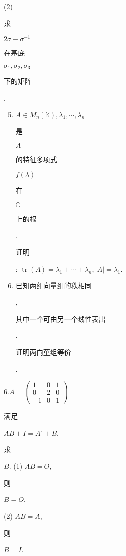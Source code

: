 \documentclass[10pt]{article}
\begin{document}
(2) \begin{CJK}{UTF8}{mj}求\end{CJK} $2 \sigma-\sigma^{-1}$ \begin{CJK}{UTF8}{mj}在基底\end{CJK} $\sigma_{1}, \sigma_{2}, \sigma_{3}$ \begin{CJK}{UTF8}{mj}下的矩阵\end{CJK}.

\begin{enumerate}
  \setcounter{enumi}{4}
  \item $A \in M_{n}(\mathbb{K}), \lambda_{1}, \cdots, \lambda_{n}$ \begin{CJK}{UTF8}{mj}是\end{CJK} $A$ \begin{CJK}{UTF8}{mj}的特征多项式\end{CJK} $f(\lambda)$ \begin{CJK}{UTF8}{mj}在\end{CJK} $\mathbb{C}$ \begin{CJK}{UTF8}{mj}上的根\end{CJK}. \begin{CJK}{UTF8}{mj}证明\end{CJK}: $\operatorname{tr}(A)=\lambda_{1}+\cdots+\lambda_{n},|A|=\lambda_{1}$.

  \item \begin{CJK}{UTF8}{mj}已知两组向量组的秩相同\end{CJK}, \begin{CJK}{UTF8}{mj}其中一个可由另一个线性表出\end{CJK}.\begin{CJK}{UTF8}{mj}证明两向荲组等价\end{CJK}.

\end{enumerate}
$6 . A=\left(\begin{array}{ccc}1 & 0 & 1 \\ 0 & 2 & 0 \\ -1 & 0 & 1\end{array}\right)$ \begin{CJK}{UTF8}{mj}满足\end{CJK} $A B+I=A^{2}+B$. \begin{CJK}{UTF8}{mj}求\end{CJK} $B$. (1) $A B=O$, \begin{CJK}{UTF8}{mj}则\end{CJK} $B=O$.

(2) $A B=A$, \begin{CJK}{UTF8}{mj}则\end{CJK} $B=I$.
\end{document}
